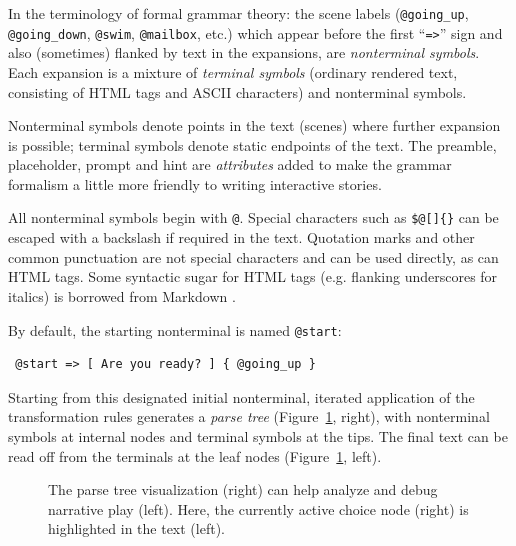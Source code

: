 \documentclass{acm_proc_article-sp}
\begin{document}
In the terminology of formal grammar theory: the scene labels ({\tt @going\_up}, {\tt @going\_down}, {\tt @swim}, {\tt @mailbox}, etc.) which appear before the first ``{\tt =>}'' sign and also (sometimes) flanked by text in the expansions, are {\em nonterminal symbols}.
Each expansion is a mixture of {\em terminal symbols} (ordinary rendered text, consisting of HTML tags and ASCII characters) and nonterminal symbols.

Nonterminal symbols denote points in the text (scenes) where further expansion is possible;
terminal symbols denote static endpoints of the text.
The preamble, placeholder, prompt and hint are {\em attributes}
added to make the grammar formalism a little more friendly to writing interactive stories.

All nonterminal symbols begin with {\tt @}.
Special characters such as {\tt \$@[]\{\}} can be escaped with a backslash if required in the text.
Quotation marks and other common punctuation are not special characters and can be used directly, as can HTML tags.
Some syntactic sugar for HTML tags (e.g. flanking underscores for italics) is borrowed from Markdown \cite{Markdown}.

By default, the starting nonterminal is named {\tt @start}:
\begin{verbatim}
 @start => [ Are you ready? ] { @going_up }
\end{verbatim}

Starting from this designated initial nonterminal,
iterated application of the transformation rules generates a {\em parse tree} (Figure~\ref{fig:tree}, right),
with nonterminal symbols at internal nodes and terminal symbols at the tips.
The final text can be read off from the terminals at the leaf nodes (Figure~\ref{fig:tree}, left).

\begin{figure}
\caption{
\label{fig:tree}
The parse tree visualization (right) can help analyze and debug narrative play (left).
Here, the currently active choice node (right) is highlighted in the text (left).
}
\end{figure}
\end{document}
